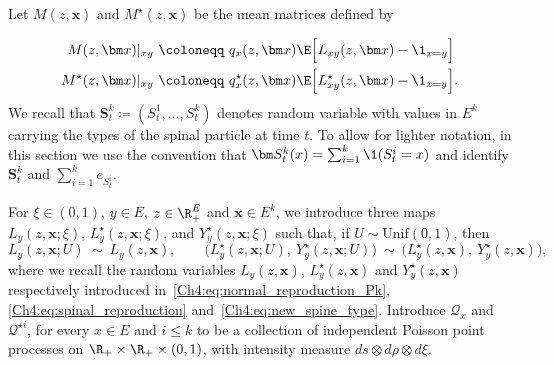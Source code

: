 \begin{refsegment}
Let $M(z, \bm x)$ and $M^\star( z, \bm x)$ be the mean matrices defined by

\begin{equation}\label{Ch4:eq:M_spines}
\begin{aligned}
  M(z, \bm x)|_{xy}\ &\coloneqq\ q_x(z,\bm x)\E\Big[L_{xy}(z,\bm x)-\1_{x=y}\Big] \\
 M^\star(z, \bm x)|_{xy}\ &\coloneqq\ q^\star_x(z,\bm x)\E\Big[L^\star_{xy}(z,\bm x)-\1_{x=y}\Big].
\end{aligned}
\end{equation}
We recall that $\bm S^k_t \coloneqq (S^1_t,\ldots, S^k_t )$ denotes random variable with values in $E^k$  carrying the types of the spinal particle at time $t$. To allow for lighter notation, in this section we use the convention that $\bm S^k_t(x)=\sum_{i=1}^k \1(S^i_t=x)$ and identify
$\bm S^k_t$ and $\sum_{i=1}^k e_{S^i_t}$.

For $\xi \in (0,1)$, $y\in E$, $z\in\R_+^E$ and $\bm x\in E^k$, we introduce three maps $L_y(z, \bm{x}; \xi)$,
$L^\star_y(z, \bm{x}; \xi)$, and $Y^\star_y(z,\bm x;\xi)$ such that, if $U \sim
\mathrm{Unif}(0,1)$, then
\[
    L_y(z, \bm{x}; U)\ \sim\ L_y(z, \bm{x}),\qquad
    \big( L^\star_y(z, \bm{x}; U),\ Y^\star_y(z,\bm x;U) \big)\ \sim\ 
    \big( L^\star_y(z, \bm{x}),\ Y^\star_y(z,\bm x) \big),
\]
where we recall the random variables $L_y(z, \bm{x})$, $ L^\star_y(z, \bm{x})$ and $Y^\star_y(z,\bm x)$ respectively introduced in~\eqref{Ch4:eq:normal_reproduction_Pk}, \eqref{Ch4:eq:spinal_reproduction} and~\eqref{Ch4:eq:new_spine_type}.
Introduce $\mathcal{Q}_{x}$ and $\mathcal{Q}^{\star i}$, for every $x\in E$ and $i\leq k$ to be a collection of independent Poisson point processes on $\R_+\times \R_+\times (0,1)$, with intensity measure $ds\otimes d\rho\otimes d\xi$.


\end{refsegment}
